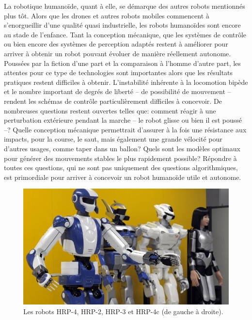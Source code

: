 La robotique humanoïde, quant à elle, se démarque des autres robots
mentionnés plus tôt. Alors que les drones et autres robots mobiles
commencent à s'enorgueillir d'une qualité quasi industrielle, les
robots humanoïdes sont encore au stade de l'enfance. Tant la
conception mécanique, que les systèmes de contrôle ou bien encore des
systèmes de perception adaptés restent à améliorer pour arriver à
obtenir un robot pouvant évoluer de manière réellement
autonome. Poussées par la fiction d'une part et la comparaison à
l'homme d'autre part, les attentes pour ce type de technologies sont
importantes alors que les résultats pratiques restent difficiles à
obtenir. L'instabilité inhérente à la locomotion bipède et le nombre
important de degrés de liberté -- de possibilité de mouvement --
rendent les schémas de contrôle particulièrement difficiles à
concevoir. De nombreuses questions restent ouvertes telles que:
comment réagir à une perturbation extérieure pendant la marche -- le
robot glisse ou bien il est poussé --? Quelle conception mécanique
permettrait d'assurer à la fois une résistance aux impacts, pour la
course, le saut, mais également une grande vélocité pour d'autres
usages, comme taper dans un ballon? Quels sont les modèles optimaux
pour générer des mouvements stables le plus rapidement possible?
Répondre à toutes ces questions, qui ne sont pas uniquement des
questions algorithmiques, est primordiale pour arriver à concevoir un
robot humanoïde utile et autonome.

\begin{figure}
  \begin{center}
    \includegraphics[width=\linewidth]{src/chap0-introduction/hrp_family.jpg}
  \end{center}
  \caption{Les robots HRP-4, HRP-2, HRP-3 et HRP-4c (de gauche à
    droite). \label{fig:hrpfamily}}
\end{figure}


